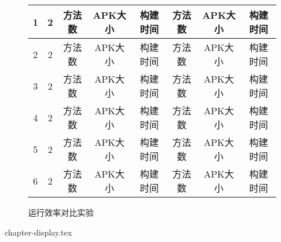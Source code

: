 {\begin{figure*}[!ht]
{\begin{threeparttable}[b]
\begin{tabular}{|c|c|c|c|c|c|c|c|}
				1&	2   &方法数 & APK大小 &	构建时间 & 方法数 & APK大小 & 构建时间\\
				\hline
				2&	2   &方法数 & APK大小 &	构建时间 & 方法数 & APK大小 & 构建时间\\
				\hline
				3&	2    &方法数 & APK大小 &	构建时间 & 方法数 & APK大小 & 构建时间\\
				\hline
				4&	2    &方法数 & APK大小 &	构建时间 & 方法数 & APK大小 & 构建时间\\
				\hline
				5&	2    &方法数 & APK大小 &	构建时间 & 方法数 & APK大小 & 构建时间\\
				\hline		
				6&	2    &方法数 & APK大小 &	构建时间 & 方法数 & APK大小 & 构建时间\\
				\hline			
	
				
				
				
			\end{tabular}
			
			
		\end{threeparttable}
	}
	
	
	\caption{运行效率对比实验}
	
	\label{tbl:hookResult}
\end{figure*}
}



 {chapter-display.tex}